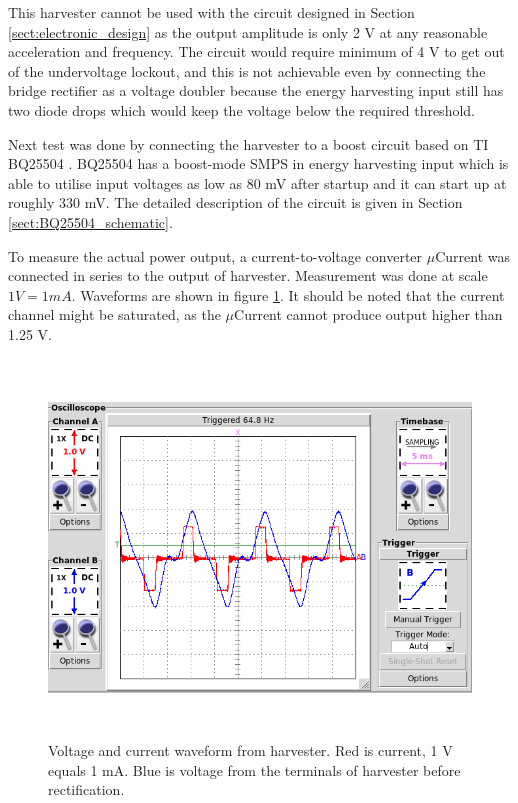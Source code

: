 This harvester cannot be used with the circuit designed in Section \ref{sect:electronic_design} as the output amplitude is only 2 V at any reasonable acceleration and frequency. The circuit would require minimum of 4 V to get out of the undervoltage lockout, and this is not achievable even by connecting the bridge rectifier as a voltage doubler because the energy harvesting input still has two diode drops which would keep the voltage below the required threshold.

Next test was done by connecting the harvester to a boost circuit based on TI BQ25504 \cite{bq25504}. BQ25504 has a boost-mode SMPS in energy harvesting input which is able to utilise input voltages as low as 80 mV after startup and it can start up at roughly 330 mV. The detailed description of the circuit is given in Section \ref{sect:BQ25504_schematic}.

To measure the actual power output, a current-to-voltage converter $\mu$Current \cite{Jones2010} was connected in series to the output of harvester. Measurement was done at scale $1 V = 1 mA$. Waveforms are shown in figure \ref{fig:inductive_vi_65}. It should be noted that the current channel might be saturated, as the $\mu$Current cannot produce output higher than 1.25 V.

\begin{figure}[htb]
\begin{center}
\includegraphics[height=10cm]{images/own_measurement/generator_shaker/inductive_td_harvesting_vi_65hz_ferro.png}
\end{center}
\caption{\label{fig:inductive_vi_65} Voltage and current waveform from harvester. Red is current, 1 V equals 1 mA. Blue is voltage from the terminals of harvester before rectification.}
\end{figure}

